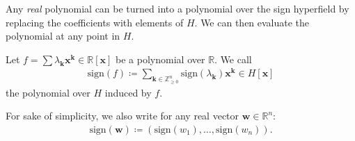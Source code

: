 Any \emph{real} polynomial can be turned into a polynomial over the sign hyperfield by replacing the coefficients with elements of \( H \). We can then evaluate the polynomial at any point in \( H \).

\begin{definition}
    Let \( f = \sum \lambda_{\mathbf{k}} \mathbf{x}^{\mathbf{k}} \in \mathbb{R}[\mathbf{x}] \) be a polynomial over \( \mathbb{R} \). We call 
    \begin{align*}
        \mathrm{sign}(f) \coloneqq \sum_{\mathbf{k} \in \mathbb{Z}^n_{\geq 0}} \mathrm{sign}(\lambda_{\mathbf{k}}) \mathbf{x}^{\mathbf{k}} \in H[\mathbf{x}]
    \end{align*}
    the polynomial over \( H \) induced by \( f \).
\end{definition}

For sake of simplicity, we also write for any real vector \( \mathbf{w} \in \mathbb{R}^n \):
\begin{align*}
    \mathrm{sign}(\mathbf{w}) \coloneqq (\mathrm{sign}(w_1), \dots, \mathrm{sign}(w_n)).
\end{align*}

